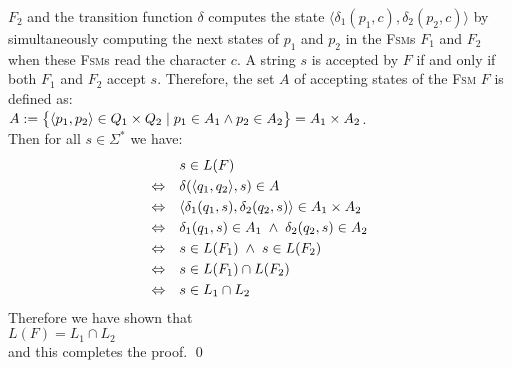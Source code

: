 $F_2$ and the transition function $\delta$ computes the state $\bigl\langle\delta_1(p_1,c), \delta_2(p_2,c)\bigr\rangle$
by simultaneously computing the next states of $p_1$ and $p_2$ in the \textsc{Fsm}s $F_1$ and $F_2$ when these
\textsc{Fsm}s read the character $c$.  A string $s$ is accepted by $F$ if and only if
both $F_1$ and  $F_2$ accept $s$.  Therefore, the set $A$ of accepting states of the \textsc{Fsm} $F$ is defined as:
\\[0.2cm]
\hspace*{1.3cm}
$A := \bigl\{ \pair(p_1,p_2) \in Q_1 \times Q_2 \mid p_1 \in A_1 \wedge p_2 \in A_2 \bigr\} = A_1 \times A_2$.
\\[0.2cm]
Then for all $s \in \Sigma^*$ we have:
$$
\begin{array}[t]{cl}
                & s \in L(F)                                                           \\[0.1cm]
\Leftrightarrow & \delta(\pair(q_1,q_2), s) \in A                                      \\[0.1cm]
\Leftrightarrow & \langle \delta_1(q_1,s), \delta_2(q_2, s) \rangle \in A_1 \times A_2 \\[0.1cm]
\Leftrightarrow & \delta_1(q_1,s) \in A_1 \;\wedge\;  \delta_2(q_2, s) \in A_2             \\[0.1cm]
\Leftrightarrow & s \in L(F_1) \;\wedge\;  s \in L(F_2)                                    \\[0.1cm]
\Leftrightarrow & s \in L(F_1) \cap L(F_2)                                             \\[0.1cm]
\Leftrightarrow & s \in L_1 \cap L_2                                                 
\end{array}
$$
Therefore we have shown that
\\[0.2cm]
\hspace*{1.3cm}
 $L(F) = L_1 \cap L_2$ 
\\[0.2cm]
and this completes the proof. \qed

